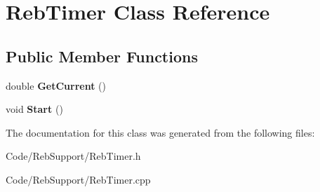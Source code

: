 \hypertarget{class_reb_timer}{}\section{Reb\+Timer Class Reference}
\label{class_reb_timer}
\subsection*{Public Member Functions}
\begin{DoxyCompactItemize}
\item 
double {\bfseries Get\+Current} ()\hypertarget{class_reb_timer_a25004de10003ca58ab95debadda0db7c}{}\label{class_reb_timer_a25004de10003ca58ab95debadda0db7c}

\item 
void {\bfseries Start} ()\hypertarget{class_reb_timer_ab2946c2466fb0c2a68be2aa599bb2130}{}\label{class_reb_timer_ab2946c2466fb0c2a68be2aa599bb2130}

\end{DoxyCompactItemize}


The documentation for this class was generated from the following files\+:\begin{DoxyCompactItemize}
\item 
Code/\+Reb\+Support/Reb\+Timer.\+h\item 
Code/\+Reb\+Support/Reb\+Timer.\+cpp\end{DoxyCompactItemize}
